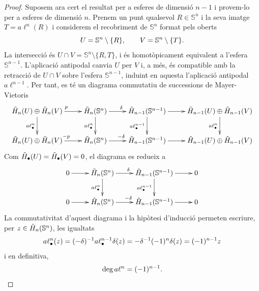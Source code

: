 \documentclass[../main.tex]{subfiles}
\begin{document}
\begin{proof}
Suposem ara cert el resultat per a esferes de dimensió $n-1$ i provem-lo per a esferes de dimensió $n$. Prenem un punt qualsevol $R\in\mathbb{S}^n$ i la seva imatge $T = a\ell^n(R)$ i considerem el recobriment de $\mathbb{S}^n$ format pels oberts
\begin{equation}
    \notag
    U = \mathbb{S}^n\setminus \{R\},\qquad V = \mathbb{S}^n\setminus\{T\}. 
\end{equation}
La intersecció és $U\cap V = \mathbb{S}^n\setminus\{R,T\}$, i és homotòpicament equivalent a l'esfera $\mathbb{S}^{n-1}$. L'aplicació antipodal canvia $U$ per $V$ i, a més, és compatible amb la retracció de $U\cap V$ sobre l'esfera $\mathbb{S}^{n-1}$, induint en aquesta l'aplicació antipodal $a\ell^{n-1}$. Per tant, es té un diagrama commutatiu de successions de Mayer-Vietoris
\begin{equation}
    \notag
    \xymatrix{
    \Tilde{H}_n(U)\oplus\Tilde{H}_n(V)\ar[d]_{a\ell^n_\bullet}\ar[r]^p & \Tilde{H}_n(\mathbb{S}^n)\ar[d]_{a\ell^n_\bullet}\ar[r]^{\delta} & \Tilde{H}_{n-1}(\mathbb{S}^{n-1})\ar[d]_{a\ell^{n-1}_\bullet}\ar[r] & \Tilde{H}_{n-1}(U)\oplus\Tilde{H}_{n-1}(V)\ar[d]_{a\ell^n_\bullet} \\
    \Tilde{H}_n(U)\oplus \Tilde{H}_n(V)\ar[r]^{-p} & \Tilde{H}_n(\mathbb{S}^n)\ar[r]^{-\delta} & \Tilde{H}_{n-1}(\mathbb{S}^{n-1})\ar[r] & \Tilde{H}_{n-1}(U)\oplus\Tilde{H}_{n-1}(V)
    }
\end{equation}
Com $\Tilde{H}_\bullet(U) = \Tilde{H}_\bullet(V) = 0$, el diagrama es redueix a 
\begin{equation}
    \notag
    \xymatrix{
    0\ar[r] & \Tilde{H}_n(\mathbb{S}^n)\ar[r]^\delta\ar[d]_{a\ell^n_\bullet} & \Tilde{H}_{n-1}(\mathbb{S}^{n-1})\ar[d]_{a\ell_\bullet^{n-1}}\ar[r] & 0 \\
    0 \ar[r] & \Tilde{H}_n(\mathbb{S}^n)\ar[r]^{-\delta} & \Tilde{H}_{n-1}(\mathbb{S}^{n-1})\ar[r] & 0
    }
\end{equation}
La commutativitat d'aquest diagrama i la hipòtesi d'inducció permeten escriure, per $z\in\Tilde{H}_n(\mathbb{S}^n)$, les igualtats
\begin{equation}
    \notag
    a\ell^n_\bullet(z) = (-\delta)^{-1}a\ell_\bullet^{n-1}\delta(z) = -\delta^{-1}(-1)^n\delta(z) = (-1)^{n-1}z
\end{equation}
i en definitiva, 
\begin{equation}
    \notag
    \deg a\ell^n = (-1)^{n-1}.
\end{equation}
\end{proof}
\end{document}
